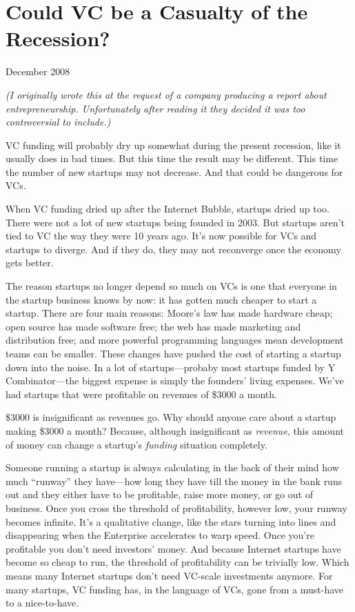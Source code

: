 \chapter{Could VC be a Casualty of the Recession?}

December 2008

\emph{(I originally wrote this at the request of a company producing a
report about entrepreneurship. Unfortunately after reading it they
decided it was too controversial to include.)}

VC funding will probably dry up somewhat during the present recession,
like it usually does in bad times. But this time the result may be
different. This time the number of new startups may not decrease. And
that could be dangerous for VCs.

When VC funding dried up after the Internet Bubble, startups dried up
too. There were not a lot of new startups being founded in 2003. But
startups aren't tied to VC the way they were 10 years ago. It's now
possible for VCs and startups to diverge. And if they do, they may not
reconverge once the economy gets better.

The reason startups no longer depend so much on VCs is one that everyone
in the startup business knows by now: it has gotten much cheaper to
start a startup. There are four main reasons: Moore's law has made
hardware cheap; open source has made software free; the web has made
marketing and distribution free; and more powerful programming languages
mean development teams can be smaller. These changes have pushed the
cost of starting a startup down into the noise. In a lot of
startups---probaby most startups funded by Y Combinator---the biggest
expense is simply the founders' living expenses. We've had startups that
were profitable on revenues of \$3000 a month.

\$3000 is insignificant as revenues go. Why should anyone care about a
startup making \$3000 a month? Because, although insignificant as
\emph{revenue}, this amount of money can change a startup's
\emph{funding} situation completely.

Someone running a startup is always calculating in the back of their
mind how much ``runway'' they have---how long they have till the money
in the bank runs out and they either have to be profitable, raise more
money, or go out of business. Once you cross the threshold of
profitability, however low, your runway becomes infinite. It's a
qualitative change, like the stars turning into lines and disappearing
when the Enterprise accelerates to warp speed. Once you're profitable
you don't need investors' money. And because Internet startups have
become so cheap to run, the threshold of profitability can be trivially
low. Which means many Internet startups don't need VC-scale investments
anymore. For many startups, VC funding has, in the language of VCs, gone
from a must-have to a nice-to-have.

